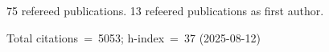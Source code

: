 75 refereed publications. 13 refeered publications as first author.

Total citations~=~5053; h-index~=~37 (2025-08-12)